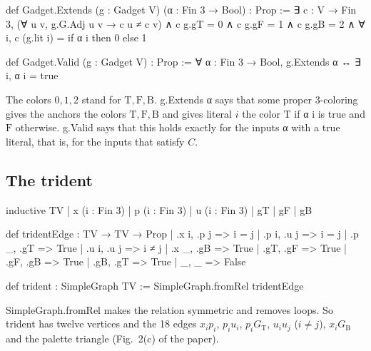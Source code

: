 \documentclass[11pt,a4paper]{article}
\newcommand{\leanus}{\textunderscore\allowbreak}
\newcommand{\lean}[1]{{\ttfamily\let\_\leanus #1}}
\newcommand{\GT}{G_{\mathrm{T}}}
\newcommand{\GB}{G_{\mathrm{B}}}
\newcommand{\T}{\mathrm{T}}
\newcommand{\F}{\mathrm{F}}
\newcommand{\B}{\mathrm{B}}
\theoremstyle{definition}
\begin{document}
\begin{code}
def Gadget.Extends (g : Gadget V) (α : Fin 3 → Bool) : Prop :=
  ∃ c : V → Fin 3, (∀ u v, g.G.Adj u v → c u ≠ c v) ∧
    c g.gT = 0 ∧ c g.gF = 1 ∧ c g.gB = 2 ∧
    ∀ i, c (g.lit i) = if α i then 0 else 1

def Gadget.Valid (g : Gadget V) : Prop :=
  ∀ α : Fin 3 → Bool, g.Extends α ↔ ∃ i, α i = true
\end{code}
The colors $0,1,2$ stand for $\T,\F,\B$. \lean{g.Extends α} says that some
proper 3-coloring gives the anchors the colors $\T,\F,\B$ and gives literal
$i$ the color $\T$ if \lean{α i} is true and $\F$ otherwise. \lean{g.Valid}
says that this holds exactly for the inputs \lean{α} with a true literal,
that is, for the inputs that satisfy $C$.

\subsection{The trident}
\begin{code}
inductive TV
  | x (i : Fin 3)
  | p (i : Fin 3)
  | u (i : Fin 3)
  | gT
  | gF
  | gB

def tridentEdge : TV → TV → Prop
  | .x i, .p j => i = j
  | .p i, .u j => i = j
  | .p _, .gT => True
  | .u i, .u j => i ≠ j
  | .x _, .gB => True
  | .gT, .gF => True
  | .gF, .gB => True
  | .gB, .gT => True
  | _, _ => False

def trident : SimpleGraph TV := SimpleGraph.fromRel tridentEdge
\end{code}
\lean{SimpleGraph.fromRel} makes the relation symmetric and removes loops.
So \lean{trident} has twelve vertices and the 18 edges $x_ip_i$, $p_iu_i$,
$p_i\GT$, $u_iu_j$ ($i\ne j$), $x_i\GB$ and the palette triangle
(Fig.~2(c) of the paper).
\end{document}
